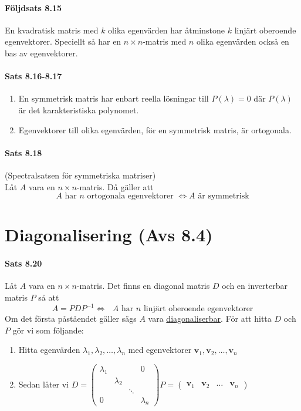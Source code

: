 \paragraph{Följdsats 8.15} En kvadratisk matris med $k$ olika egenvärden har åtminstone $k$ linjärt oberoende egenvektorer.
Speciellt så har en $n\times n$-matris med $n$ olika egenvärden också en bas av egenvektorer.

\paragraph{Sats 8.16-8.17}
\begin{enumerate}[label=(\alph*)]
    \item En symmetrisk matris har enbart reella lösningar till $P(\lambda)=0$ där $P(\lambda)$ är det karakteristiska polynomet.
    \item Egenvektorer till olika egenvärden, för en symmetrisk matris, är ortogonala.
\end{enumerate}

\paragraph{Sats 8.18} (Spectralsatsen för symmetriska matriser)\\
Låt $A$ vara en $n\times n$-matris.
Då gäller att
\begin{equation*}
    A\text{ har }n\text{ ortogonala egenvektorer }\Leftrightarrow A\text{ är symmetrisk}
\end{equation*}

\section{Diagonalisering (Avs 8.4)}

\paragraph{Sats 8.20} Låt $A$ vara en $n\times n$-matris.
Det finns en diagonal matris $D$ och en inverterbar matris $P$ så att
\begin{equation*}
    A=PDP^{-1} \Leftrightarrow \text{ } A \text{ har } n \text{ linjärt oberoende egenvektorer}
\end{equation*}
Om det första påståendet gäller sägs $A$ vara \underline{diagonaliserbar}.
För att hitta $D$ och $P$ gör vi som följande:
\begin{enumerate}
    \item[] Hitta egenvärden $\lambda_1,\lambda_2,\ldots,\lambda_n$ med egenvektorer $\bm{v}_1,\bm{v}_2,\ldots,\bm{v}_n$
    \item[] Sedan låter vi $D=\begin{pmatrix}
        \lambda_1&&&0\\
        &\lambda_2&&\\
        &&\ddots&\\
        0&&&\lambda_n
    \end{pmatrix}
    P=\begin{pmatrix}
        \bm{v}_1&\bm{v}_2&\ldots&\bm{v}_n
    \end{pmatrix}$
\end{enumerate}

